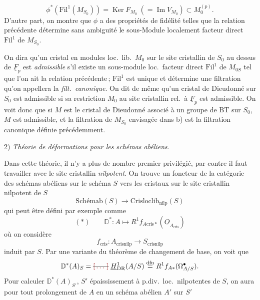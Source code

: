 \documentclass[11pt,a4paper]{article}
\begin{document}
\[
  \phi^*(\mathrm{Fil}^1(M_{S_0})) = \operatorname{Ker} F_{M_0} \;(= \operatorname{Im} V_{M_0}) \subset M_0^{(p)} .
\]
D'autre part, on montre que $\phi$ a des propriétés de fidélité telles que la relation précédente détermine sans ambiguité le sous-Module localement facteur direct $\mathrm{Fil}^1$ de $M_{S_0}$.

On dira qu'un cristal en modules loc.\ lib.\ $M_0$ sur le site cristallin de $S_0$ au dessus de $\underline{F}_p$ est \emph{admissible} s'il existe un sous-module loc.\ facteur direct $\mathrm{Fil}^1$ de $M_{0S}$ tel que l'on ait la relation précédente\,;   $\mathrm{Fil}^1$ est unique et  détermine une filtration qu'on appellera la \emph{filt.\ canonique}. On dit de même qu'un cristal de Dieudonné  sur $S_0$ est admissible si sa restriction $M_0$  au site cristallin rel.\ à $\underline{F}_p$ est admissible.
On voit donc que si $M$ est le cristal de Dieudonné associé à un groupe de BT sur $S_0$, $M$ est admissible, et la filtration de $M_{S_0}$ envisagée dans b) est la filtration canonique définie précédemment.


2) \emph{Théorie de déformations pour les schémas abéliens.}

 Dans cette théorie, il n'y a plus de nombre premier privilégié, par contre il faut travailler avec le site cristallin \emph{nilpotent}. On trouve un foncteur  de la catégorie des schémas abéliens sur le schéma $S$ vers les  cristaux sur le site cristallin nilpotent de $S$
\[
  \mathrm{Schémab}(S) \longrightarrow \mathrm{Crisloclib}_{\mathrm{nilp}}(S)
\]
qui peut être défini par exemple comme
\[
  (*) \qquad \mathbb{D}^* : A \longmapsto R^1 f_{A\mathrm{cris}*}(\underline{O}_{A_{\mathrm{cris}}})
\]
où on considère
\[
  f_{\mathrm{cris}} : A_{\mathrm{crisnilp}} \longrightarrow S_{\mathrm{crisnilp}}
\]
induit par $S$. Par une variante du théorème de changement de base, on voit que
\[
  \mathbb{D}^*(A)_S = \text{\struck{\ill{}}}\; \underline{H}^1_{\mathrm{DR}}(A/S) \overset{\mathrm{dfn}}{=} R^1 f_{A*}(\Omega^{\bullet}_{A/S}) .
\]
Pour calculer $\mathbb{D}^*(A)_{S'}$, $S'$ épaississement à p.div.\ loc.\ nilpotentes de $S$, on aura pour tout prolongement  de $A$ en un schéma abélien $A'$ sur $S'$
\end{document}
